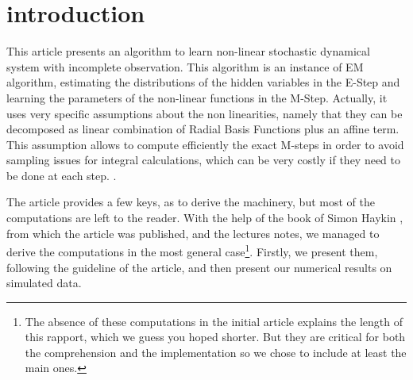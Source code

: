 \section*{introduction}
This article \cite{article} presents an algorithm to learn non-linear stochastic dynamical system with incomplete observation. This algorithm is an instance of EM algorithm, estimating the distributions of the hidden variables in the E-Step and learning the parameters of the non-linear functions in the M-Step. Actually, it uses very specific assumptions about the non linearities, namely that they can be decomposed as linear combination of Radial Basis Functions plus an affine term. This assumption allows to compute efficiently the exact M-steps in order to avoid sampling issues for integral calculations, which can be very costly if they need to be done at each step.
.

The article provides a few keys, as to derive the machinery, but most of the computations are left to the reader. With the help of the book of Simon Haykin \cite{SimonHaykin}, from which the article was published,  and the lectures notes, we managed to derive the computations in the most general case\footnote{The absence of these computations in the initial article explains the length of this rapport, which we guess you hoped shorter. But they are critical for both the comprehension and the implementation so we chose to include at least the main ones.}. Firstly, we present them, following the guideline of the article, and then present our numerical results on simulated data. 





